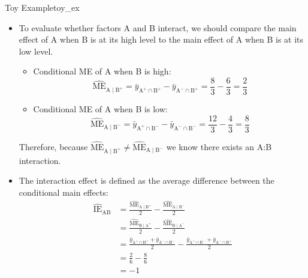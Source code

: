 \begin{Example}{Toy Example}{toy_ex}
\begin{itemize}
\begin{align*}
                   & =\frac{(6/3)+(8/3)}{2}-\frac{(4/3)+(12/3)}{2}                                      \\
                   & =-1/3
              \end{align*}
              Therefore, we expect the average response to go down by $ 1/3 $ when B is moved from its low to high level.
        \item To evaluate whether factors A and B interact, we should compare the main effect of A when B is at
              its high level to the main effect of A when B is at its low level.
              \begin{itemize}
                  \item Conditional ME of A when B is high:
                        \[ \widehat{\text{ME}}_{\text{A}\mid \text{B}^+}=\bar{y}_{\text{A}^+\cap \text{B}^+}-\bar{y}_{\text{A}^-\cap \text{B}^+}=\frac{8}{3}-\frac{6}{3}=\frac{2}{3} \]
                  \item Conditional ME of A when B is low:
                        \[ \widehat{\text{ME}}_{\text{A}\mid \text{B}^-}=\bar{y}_{\text{A}^+\cap \text{B}^-}-\bar{y}_{\text{A}^-\cap \text{B}^-}=\frac{12}{3}-\frac{4}{3} =\frac{8}{3} \]
              \end{itemize}
              Therefore, because $ \widehat{\text{ME}}_{\text{A}\mid \text{B}^+}\ne\widehat{\text{ME}}_{\text{A}\mid \text{B}^-} $ we know there exists an A:B interaction.
        \item The interaction effect is defined as the average difference between the conditional main effects:
              \begin{align*}
                  \widehat{\text{IE}}_{\text{AB}}
                   & =\frac{\widehat{\text{ME}}_{\text{A}\mid \text{B}^+}}{2}-\frac{\widehat{\text{ME}}_{\text{A}\mid \text{B}^-}}{2}                                                     \\
                   & =\frac{\widehat{\text{ME}}_{\text{B}\mid \text{A}^+}}{2}-\frac{\widehat{\text{ME}}_{\text{B}\mid \text{A}^-}}{2}                                                     \\
                   & =\frac{\bar{y}_{\text{A}^+\cap \text{B}^+}+\bar{y}_{\text{A}^-\cap \text{B}^-}}{2}-\frac{\bar{y}_{\text{A}^+\cap \text{B}^-}+\bar{y}_{\text{A}^-\cap \text{B}^+}}{2} \\
                   & =\frac{2}{6}-\frac{8}{6}                                                                                                                                             \\
                   & =-1
              \end{align*}
    \end{itemize}
\end{Example}
